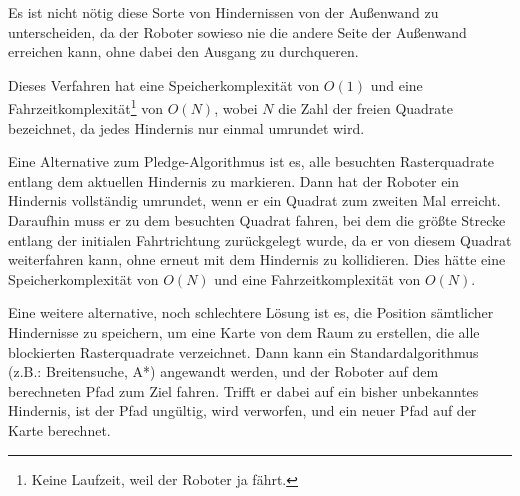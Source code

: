 \documentclass[10pt,a4paper]{article}
\begin{document}
\begin{center}
\end{center}

Es ist nicht nötig diese Sorte von Hindernissen von der Außenwand zu unterscheiden, da der Roboter sowieso nie die andere Seite der Außenwand erreichen kann, ohne dabei den Ausgang zu durchqueren. %

Dieses Verfahren hat eine Speicherkomplexität von $O(1)$ und eine Fahrzeitkomplexität\footnote{Keine Laufzeit, weil der Roboter ja fährt.} von $O(N)$, wobei $N$ die Zahl der freien Quadrate bezeichnet, da jedes Hindernis nur einmal umrundet wird.

\vspace*{0.5cm}

Eine Alternative zum Pledge-Algorithmus ist es, alle besuchten Rasterquadrate entlang dem aktuellen Hindernis zu markieren. Dann hat der Roboter ein Hindernis vollständig umrundet, wenn er ein Quadrat zum zweiten Mal erreicht. Daraufhin muss er zu dem besuchten Quadrat fahren, bei dem die größte Strecke entlang der initialen Fahrtrichtung zurückgelegt wurde, da er von diesem Quadrat weiterfahren kann, ohne erneut mit dem Hindernis zu kollidieren. %
Dies hätte eine Speicherkomplexität von $O(N)$ und eine Fahrzeitkomplexität von $O(N)$.



\vspace{0.5cm}

Eine weitere alternative, noch schlechtere Lösung ist es, die Position sämtlicher Hindernisse zu speichern, um eine Karte von dem Raum zu erstellen, die alle blockierten Rasterquadrate verzeichnet.  Dann kann ein Standardalgorithmus (z.B.: Breitensuche, A*) angewandt werden, und der Roboter auf dem berechneten Pfad zum Ziel fahren. Trifft er dabei auf ein bisher unbekanntes Hindernis, ist der Pfad ungültig, wird verworfen, und ein neuer Pfad auf der Karte berechnet. 
\end{document}
